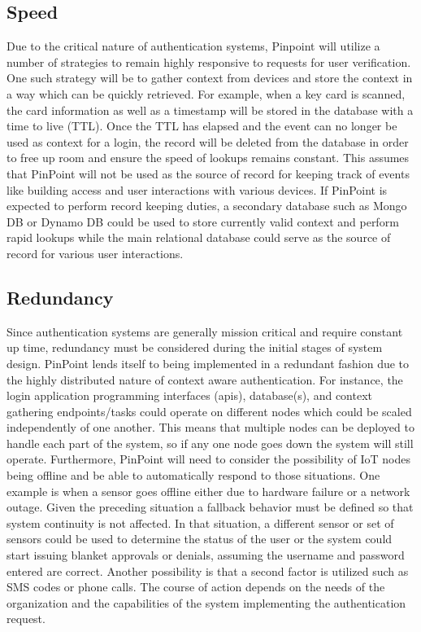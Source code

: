 \documentclass[11pt,journal]{IEEEtran}
\begin{document}
\subsection{Speed}
Due to the critical nature of authentication systems, Pinpoint will utilize a number of strategies to remain highly responsive to requests for user verification.  One such strategy will be to gather context from devices and store the context in a way which can be quickly retrieved.  For example, when a key card is scanned, the card information as well as a timestamp will be stored in the database with a time to live (TTL).  Once the TTL has elapsed and the event can no longer be used as context for a login, the record will be deleted from the database in order to free up room and ensure the speed of lookups remains constant.  This assumes that PinPoint will not be used as the source of record for keeping track of events like building access and user interactions with various devices.  If PinPoint is expected to perform record keeping duties, a secondary database such as Mongo DB or Dynamo DB could be used to store currently valid context and perform rapid lookups while the main relational database could serve as the source of record for various user interactions.

\subsection{Redundancy}
Since authentication systems are generally mission critical and require constant up time, redundancy must be considered during the initial stages of system design.  PinPoint lends itself to being implemented in a redundant fashion due to the highly distributed nature of context aware authentication.  For instance, the login application programming interfaces (apis), database(s), and context gathering endpoints/tasks could operate on different nodes which could be scaled independently of one another.  This means that multiple nodes can be deployed to handle each part of the system, so if any one node goes down the system will still operate.  Furthermore, PinPoint will need to consider the possibility of IoT nodes being offline and be able to automatically respond to those situations.  One example is when a sensor goes offline either due to hardware failure or a network outage.  Given the preceding situation a fallback behavior must be defined so that system continuity is not affected.  In that situation, a different sensor or set of sensors could be used to determine the status of the user or the system could start issuing blanket approvals or denials, assuming the username and password entered are correct.  Another possibility is that a second factor is utilized such as SMS codes or phone calls.  The course of action depends on the needs of the organization and the capabilities of the system implementing the authentication request.
\end{document}
